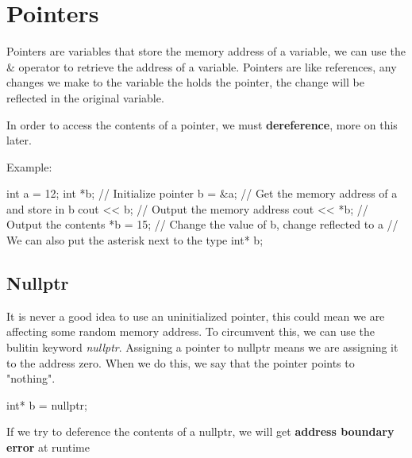 \documentclass{report}
\begin{document}
    \pagebreak \bigbreak \noindent 
    \section{\LARGE Pointers}
    \bigbreak \noindent 
    \begin{concept}
 Pointers are variables that store the memory address of a variable, we can use the \& operator to retrieve the address of a variable. Pointers are like references, any changes we make to the variable the holds the pointer, the change will be reflected in the original variable.
	\end{concept}
    \bigbreak \noindent 
    \begin{notebox}
        In order to access the contents of a pointer, we must \textbf{dereference}, more on this later.
    \end{notebox}
    
    \bigbreak \noindent 
    Example:
    \bigbreak \noindent 
    
    \begin{cppcode}
int a = 12;
int *b; // Initialize pointer  
b = &a; // Get the memory address of a and store in b
cout << b; // Output the memory address
cout << *b; // Output the contents
*b = 15; // Change the value of b, change reflected to a
// We can also put the asterisk next to the type
int* b;
    \end{cppcode}
    

    \bigbreak \noindent 
    \subsection{Nullptr}
    \bigbreak \noindent 
    It is never a good idea to use an uninitialized pointer, this could mean we are affecting some random memory address. To circumvent this, we can use the bulitin keyword \textit{nullptr}. Assigning a pointer to nullptr means we are assigning it to the address zero. When we do this, we say that the pointer points to "nothing".
    \bigbreak \noindent 
    
    \begin{cppcode}
int* b = nullptr;
    \end{cppcode}
    
    \bigbreak \noindent 
    \begin{notebox}
        If we try to deference the contents of a nullptr, we will get \textbf{address boundary error} at runtime
    \end{notebox}
    
\end{document}
